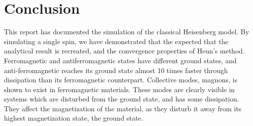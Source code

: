 \documentclass{article}
\begin{document}
    \section*{Conclusion}
    This report has documented the simulation of the classical Heisenberg model. By simulating a single spin, we have demonstrated that the expected that the analytical result is recreated, and the convergence properties of Heun's method.
    Ferromagnetic and antiferromagnetic states have different ground states, and anti-ferromagnetic reaches its ground state almost 10 times faster through dissipation than its ferromagnetic counterpart.
    Collective modes, magnons, is shown to exist in ferromagnetic materials.
    These modes are clearly visible in systems which are disturbed from the ground state, and has some dissipation.
    They affect the magnetization of the material, as they disturb it away from its highest magnetization state, the ground state.

    \printbibliography
\end{document}
